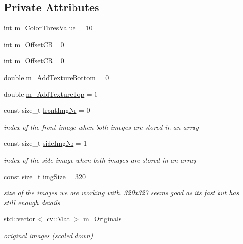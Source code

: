 \subsection*{Private Attributes}
\begin{DoxyCompactItemize}
\item 
int \hyperlink{class_face3_d_1_1_detection_af355af4e433dcf85e4ebdfbd36ae8939}{m\+\_\+\+Color\+Thres\+Value} = 10
\item 
int \hyperlink{class_face3_d_1_1_detection_aa8e12b00e14ee4ef67c7316163625ac4}{m\+\_\+\+Offset\+CB} =0
\item 
int \hyperlink{class_face3_d_1_1_detection_a0507241bc6482cebf174e53ea311c885}{m\+\_\+\+Offset\+CR} =0
\item 
double \hyperlink{class_face3_d_1_1_detection_a7ce314f4e8ab7f9ce1d2c8d38d7ed6b3}{m\+\_\+\+Add\+Texture\+Bottom} = 0
\item 
double \hyperlink{class_face3_d_1_1_detection_af14dc904e457d96b31ac6e329160936a}{m\+\_\+\+Add\+Texture\+Top} = 0
\item 
const size\+\_\+t \hyperlink{class_face3_d_1_1_detection_a1c1137f1d9972fd213a04f93084a0d5c}{front\+Img\+Nr} = 0
\begin{DoxyCompactList}\small\item\em index of the front image when both images are stored in an array \end{DoxyCompactList}\item 
const size\+\_\+t \hyperlink{class_face3_d_1_1_detection_a7a2e671e0ba9133f1fd8e877bc5a89f9}{side\+Img\+Nr} = 1
\begin{DoxyCompactList}\small\item\em index of the side image when both images are stored in an array \end{DoxyCompactList}\item 
const size\+\_\+t \hyperlink{class_face3_d_1_1_detection_a7d9ef90ae57f59f0e73edec0dffd9bd7}{img\+Size} = 320
\begin{DoxyCompactList}\small\item\em size of the images we are working with. 320x320 seems good as its fast but has still enough details \end{DoxyCompactList}\item 
std\+::vector$<$ cv\+::\+Mat $>$ \hyperlink{class_face3_d_1_1_detection_a237f409f79b8417f906732dc522322a8}{m\+\_\+\+Originals}
\begin{DoxyCompactList}\small\item\em original images (scaled down) \end{DoxyCompactList}\item 

\end{DoxyCompactItemize}
